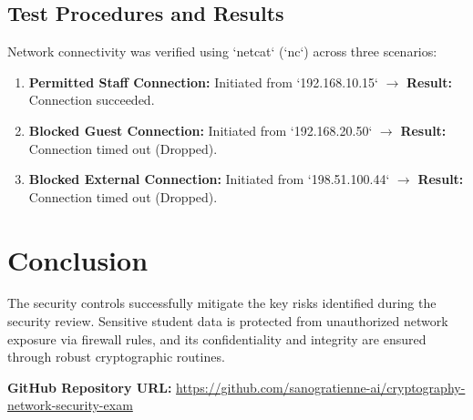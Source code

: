 \documentclass[11pt,a4paper]{article}
\begin{document}
\subsection{Test Procedures and Results}
Network connectivity was verified using `netcat` (`nc`) across three scenarios:
\begin{enumerate}
    \item \textbf{Permitted Staff Connection:} Initiated from `192.168.10.15` $\rightarrow$ \textbf{Result:} Connection succeeded.
    \item \textbf{Blocked Guest Connection:} Initiated from `192.168.20.50` $\rightarrow$ \textbf{Result:} Connection timed out (Dropped).
    \item \textbf{Blocked External Connection:} Initiated from `198.51.100.44` $\rightarrow$ \textbf{Result:} Connection timed out (Dropped).
\end{enumerate}

\section{Conclusion}
The security controls successfully mitigate the key risks identified during the security review. Sensitive student data is protected from unauthorized network exposure via firewall rules, and its confidentiality and integrity are ensured through robust cryptographic routines.

\vspace{0.5cm}
\noindent\textbf{GitHub Repository URL:} \url{https://github.com/sanogratienne-ai/cryptography-network-security-exam}
\end{document}
